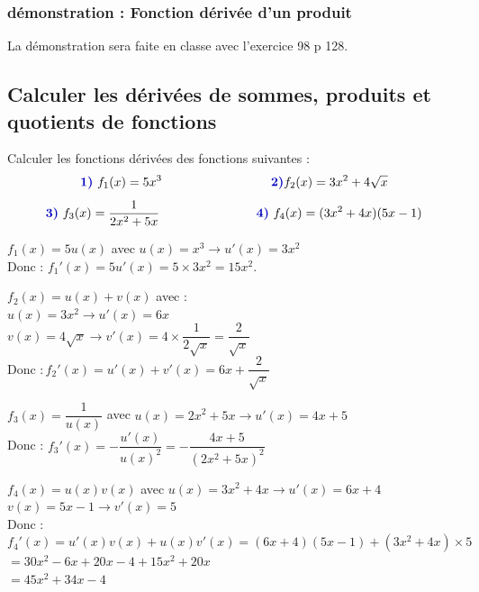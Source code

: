 \subsubsection{démonstration : Fonction dérivée d'un produit}
La démonstration sera faite en classe avec l'exercice 98 p 128.

\subsection{Calculer les dérivées de sommes, produits et quotients de fonctions}

\begin{bmethode}
Calculer les fonctions dérivées des fonctions suivantes :
\[\mBleu{1)}\ f_1(x)=5x^3\ \ \ \ \ \ \ \ \ \ \ \ \ \ \ \ \ \ \ \ \ \ \ \ \ \ \mBleu{2)} f_2(x)=3x^2+4\sqrt{x}\]
\[\mBleu{3)}\  f_3(x)=\dfrac{1}{2x^2+5x}\ \ \ \ \ \ \ \ \  \ \ \ \ \ \ \ \ \ \ \ \ \ \ \mBleu{4)}\ f_4 (x)=(3x^2+4x)(5x-1)\]

\begin{enumMet}
	\item  $f_1(x)=5u(x)$ avec $u(x)=x^3 \rightarrow u'(x)=3x^2$\\
	Donc : $f_1'(x)=5u'(x)=5\times 3x^2=15x^2$.\\
	\item $f_2(x)=u(x)+v(x)$ avec :\\
	$u(x)=3x^2 \rightarrow u'(x)=6x$\\
	$v(x)=4\sqrt{x} \rightarrow v'(x)=4\times \dfrac{1}{2\sqrt{x}}= \dfrac{2}{\sqrt{x}}$\\			
	$\text{Donc }: f_2'(x)=u'(x)+v'(x) = 6x + \dfrac{2}{\sqrt{x}}$\\
	\item $f_3(x)=\dfrac{1}{u(x)}$ avec $u(x)=2x^2+5x \rightarrow u'(x)=4x+5$\\
	Donc : $f_3'(x)= - \dfrac{u'(x)}{u(x)^2}= -\dfrac{4x+5}{(2x^2+5x)^2}$\\
	\item $f_4(x)=u(x)v(x)$ avec $u(x)=3x^2+4x \rightarrow u'(x)=6x+4$\\
	$v(x)=5x-1 \rightarrow v'(x)=5$\\			
	Donc : $f_4'(x)=u'(x)v(x)+u(x)v'(x) = (6x+4)(5x-1) + (3x^2+4x )\times 5$\\
	$=30x^2-6x+20x-4+15x^2+20x$\\
	$=45x^2+34x-4$\\
\end{enumMet}
\end{bmethode}


